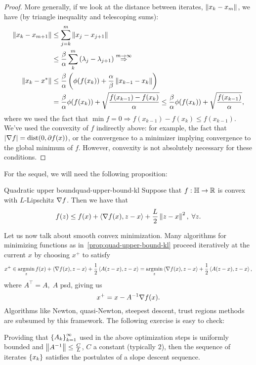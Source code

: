 \begin{proof}
	More generally, if we look at the distance between iterates, $\left \| x_k -
	x_{m} \right \|$, we have (by triangle inequality and telescoping sums):
	\begin{align*}
		\left \| x_k - x_{m+1} \right \| &\leq \sum_{j=k}^m \left \| x_j - x_{j+1} \right \| \\
			&\leq \frac{\beta}{\alpha} \sum_{k}^m \left(
				\lambda_j - \lambda_{j+1} \right) \overset{m \to
				\infty}{\Rightarrow} \\
		\left \| x_k - x^* \right \| &\leq \frac{\beta}{\alpha} \left(
			\phi(f(x_k)) + \frac{\alpha}{\beta}
			\left \| x_{k-1} - x_k \right \|
		\right) \\
		&= \frac{\beta}{\alpha} \phi(f(x_k)) +
		\sqrt{\frac{f(x_{k-1}) - f(x_k)}{\alpha}}
		\leq \frac{\beta}{\alpha} \phi(f(x_k)) +
		\sqrt{\frac{f(x_{k-1})}{\alpha}},
	\end{align*}
	where we used the fact that $\min f = 0 \Rightarrow
	f(x_{k-1}) - f(x_k) \leq f(x_{k-1})$. We've used the convexity of $f$
	indirectly above: for example, the fact that $\left| \nabla f \right| = \mathrm{dist}(0,
	\partial f(x))$, or the convergence to a minimizer implying convergence to
	the global minimum of $f$. However, convexity is not absolutely necessary
	for these conditions.
\end{proof}

For the sequel, we will need the following proposition:
\begin{cproposition}{Quadratic upper bound}{quad-upper-bound-kl}
	Suppose that $f: \mathbb{H} \to \mathbb{R}$ is convex with $L$-Lipschitz $\nabla f$.
	Then we have that
	\[
		f(z) \leq f(x) + \left\langle \nabla f(x), z - x \right\rangle + \frac{L}{2} \left \| z - x \right \|^2,
		\; \forall z.
	\]
\end{cproposition}

Let us now talk about smooth convex minimization. Many algorithms for
minimizing functions as in~\cref{prop:quad-upper-bound-kl} proceed iteratively
at the current $x$ by choosing $x^+$ to satisfy
\[
	x^+ \in \operatorname*{argmin}_z f(x) + \left\langle \nabla f(x), z - x \right\rangle +
		\frac{1}{2} \left\langle A (z - x), z - x \right\rangle =
		\operatorname*{argmin}_z \left\langle \nabla f(x), z - x \right\rangle +
		\frac{1}{2} \left\langle A (z - x), z - x \right\rangle,
\]
where $A^\top = A, \; A$ psd, giving us
\[
	x^+ = x - A^{-1} \nabla f(x).
\]
Algorithms like Newton, quasi-Newton, steepest descent, trust regions methods
are subsumed by this framework. The following exercise is easy to check:
\begin{exercise}{}{}
	Providing that $\left\{ A_k \right\}_{k=1}^{\infty}$ used in the above optimization
	steps is uniformly bounded and $\left \| A^{-1} \right \| \leq \frac{C}{L}$, $C$ a
	constant (typically $2$), then the sequence of iterates $\left\{ x_k \right\}$
	satisfies the postulates of a slope descent sequence.
\end{exercise}
